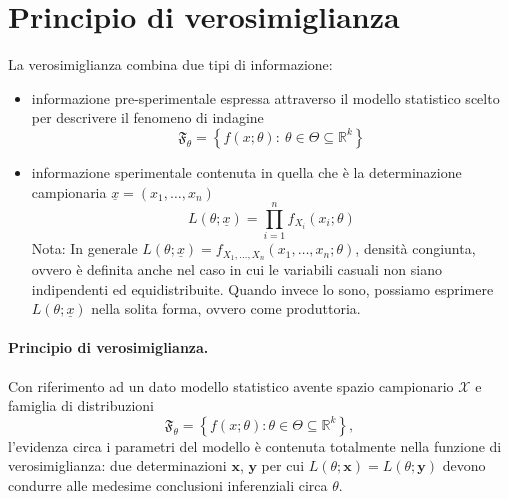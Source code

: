 \section{Principio di verosimiglianza}

La verosimiglianza combina due tipi di informazione:
\begin{itemize}
\item informazione pre-sperimentale espressa attraverso il modello statistico scelto per descrivere il fenomeno di indagine
$$\mathfrak{F}_\theta=\left\{f(x;\theta):\ \theta\in\Theta\subseteq\mathbb{R}^k\right\}$$
\item informazione sperimentale contenuta in quella che è la determinazione campionaria $\underline{x}=(x_1,\ldots, x_n)$
$$L(\theta;\underline{x})=\prod_{i=1}^n f_{X_i}(x_i;\theta)$$
Nota: In generale $L(\theta;\underline{x})=f_{X_1,\ldots, X_n}(x_1,\ldots, x_n;\theta)$, densità congiunta, ovvero è definita anche nel caso in cui le variabili casuali non siano indipendenti ed equidistribuite. Quando invece lo sono, possiamo esprimere $L(\theta; \underline{x})$ nella solita forma, ovvero come produttoria.
\end{itemize}

\paragraph{Principio di verosimiglianza.}
  Con riferimento ad un dato modello statistico avente spazio campionario
  \(\mathcal{X}\) e famiglia di distribuzioni
  \begin{equation*}
    \mathfrak{F}_\theta=
    \left\lbrace f(x;\theta) \colon
    \theta\in\Theta\subseteq\mathbb{R}^k\right\rbrace,
  \end{equation*}
  l'evidenza circa i parametri del modello è contenuta totalmente nella
  funzione di verosimiglianza: due determinazioni \(\mathbf{x}\),
  \(\mathbf{y}\) per cui \(L(\theta;\mathbf{x})=L(\theta;\mathbf{y})\)
  devono condurre alle medesime conclusioni inferenziali circa \(\theta\).

